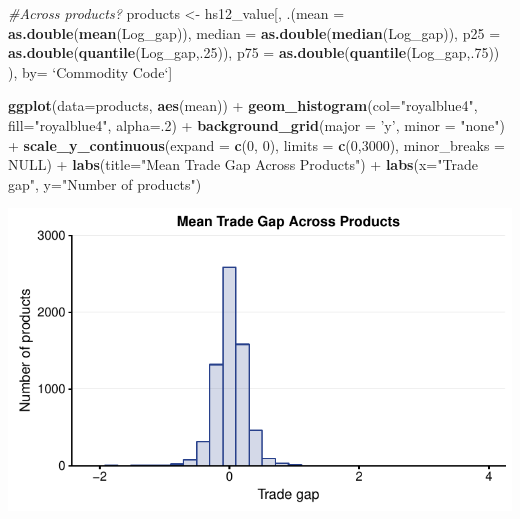 \documentclass[10pt,]{article}
\newenvironment{Shaded}{\begin{snugshade}}{\end{snugshade}}
\newcommand{\KeywordTok}[1]{\textcolor[rgb]{0.13,0.29,0.53}{\textbf{{#1}}}}
\newcommand{\DataTypeTok}[1]{\textcolor[rgb]{0.13,0.29,0.53}{{#1}}}
\newcommand{\DecValTok}[1]{\textcolor[rgb]{0.00,0.00,0.81}{{#1}}}
\newcommand{\StringTok}[1]{\textcolor[rgb]{0.31,0.60,0.02}{{#1}}}
\newcommand{\CommentTok}[1]{\textcolor[rgb]{0.56,0.35,0.01}{\textit{{#1}}}}
\newcommand{\OtherTok}[1]{\textcolor[rgb]{0.56,0.35,0.01}{{#1}}}
\newcommand{\NormalTok}[1]{{#1}}
\begin{document}
\begin{Shaded}
\begin{Highlighting}[]
\CommentTok{#Across products?}
\NormalTok{products <-}\StringTok{ }\NormalTok{hs12_value[, .(}\DataTypeTok{mean =} \KeywordTok{as.double}\NormalTok{(}\KeywordTok{mean}\NormalTok{(Log_gap)),}
                     \DataTypeTok{median =} \KeywordTok{as.double}\NormalTok{(}\KeywordTok{median}\NormalTok{(Log_gap)),}
                     \DataTypeTok{p25 =} \KeywordTok{as.double}\NormalTok{(}\KeywordTok{quantile}\NormalTok{(Log_gap,.}\DecValTok{25}\NormalTok{)),}
                     \DataTypeTok{p75 =} \KeywordTok{as.double}\NormalTok{(}\KeywordTok{quantile}\NormalTok{(Log_gap,.}\DecValTok{75}\NormalTok{))}
\NormalTok{),}
\NormalTok{by=}\StringTok{ `}\DataTypeTok{Commodity Code}\StringTok{`}\NormalTok{]}

\KeywordTok{ggplot}\NormalTok{(}\DataTypeTok{data=}\NormalTok{products, }\KeywordTok{aes}\NormalTok{(mean)) +}
\StringTok{  }\KeywordTok{geom_histogram}\NormalTok{(}\DataTypeTok{col=}\StringTok{"royalblue4"}\NormalTok{,}
                 \DataTypeTok{fill=}\StringTok{"royalblue4"}\NormalTok{,}
                 \DataTypeTok{alpha=}\NormalTok{.}\DecValTok{2}\NormalTok{) +}
\StringTok{  }\KeywordTok{background_grid}\NormalTok{(}\DataTypeTok{major =} \StringTok{'y'}\NormalTok{, }\DataTypeTok{minor =} \StringTok{"none"}\NormalTok{) +}
\StringTok{  }\KeywordTok{scale_y_continuous}\NormalTok{(}\DataTypeTok{expand =} \KeywordTok{c}\NormalTok{(}\DecValTok{0}\NormalTok{, }\DecValTok{0}\NormalTok{), }\DataTypeTok{limits =} \KeywordTok{c}\NormalTok{(}\DecValTok{0}\NormalTok{,}\DecValTok{3000}\NormalTok{), }\DataTypeTok{minor_breaks =} \OtherTok{NULL}\NormalTok{) +}
\StringTok{  }\KeywordTok{labs}\NormalTok{(}\DataTypeTok{title=}\StringTok{"Mean Trade Gap Across Products"}\NormalTok{) +}
\StringTok{  }\KeywordTok{labs}\NormalTok{(}\DataTypeTok{x=}\StringTok{"Trade gap"}\NormalTok{, }\DataTypeTok{y=}\StringTok{"Number of products"}\NormalTok{)}
\end{Highlighting}
\end{Shaded}

\begin{center}\includegraphics{Figs/value_time-2} \end{center}
\end{document}
